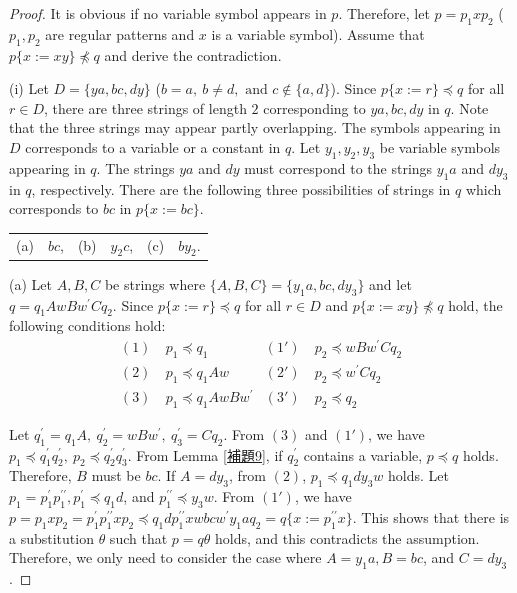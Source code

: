 \begin{proof}
It is obvious if no variable symbol appears in $p$.
Therefore, let $p=p_{1}xp_{2}$ ($p_{1}, p_{2}$ are regular patterns and $x$ is a variable symbol). Assume that $p \{ x := xy \} \not \preceq q$ and derive the contradiction.

\noindent\textrm{(i)}
Let $D=\{ ya, bc, dy \}$ ($b = a,~b \not= d,\mbox{~and~}c \not\in \{a,d\}$).
Since $p \{ x := r \} \preceq q$ for all $r \in D$, there are three strings of length $2$ corresponding to $ya, bc, dy$ in $q$. Note that the three strings may appear partly overlapping.
The symbols appearing in $D$ corresponds to a variable or a constant in $q$.
Let $y_{1}, y_{2}, y_{3}$ be variable symbols appearing in $q$.
The strings $ya$ and $dy$ must correspond to the strings $y_{1}a$ and $dy_{3}$ in $q$, respectively.
There are the following three possibilities of strings in $q$ which corresponds to $bc$ in $p\{x:=bc\}$.
\begin{center}
\begin{tabular}{cccccc}
\textrm{(a)} & $bc$, &
\textrm{(b)} & $y_{2}c$, &
\textrm{(c)} & $by_{2}$.
\end{tabular}
\end{center}

\textrm{(a)}
Let $A,B,C$ be strings where $\{ A,B,C \} = \{ y_{1}a,bc,dy_{3} \}$ and let $q=q_{1}AwBw^{\prime}Cq_{2}$.
Since $p \{ x := r \} \preceq q$ for all $r \in D$ and $p \{ x := xy \} \not \preceq q$ hold, the following conditions hold:
\begin{align*}
(1)~& p_{1} \preceq q_{1} & (1')~& p_{2} \preceq wBw^{\prime}Cq_{2} \\
(2)~& p_{1} \preceq q_{1}Aw & (2')~& p_{2} \preceq w^{\prime}Cq_{2} \\
(3)~& p_{1} \preceq q_{1}AwBw^{\prime} & (3')~& p_{2} \preceq q_{2}
\end{align*}

Let $q^{\prime}_{1}=q_{1}A,~q^{\prime}_{2}=wBw^{\prime},~q^{\prime}_{3}=Cq_{2}$. From $(3)$ and $(1')$, we have $p_{1} \preceq q^{\prime}_{1}q^{\prime}_{2},~p_{2} \preceq q^{\prime}_{2}q^{\prime}_{3}$.
From Lemma \ref{補題9}, if $q^{\prime}_{2}$ contains a variable, $p \preceq q$ holds.
Therefore, $B$ must be $bc$.
If $A=dy_{3}$, from $(2)$, $p_{1} \preceq q_{1}dy_{3}w$ holds.
Let $p_{1}=p^{\prime}_{1}p^{\prime\prime}_{1}, p^{\prime}_{1} \preceq q_{1}d$, and $p^{\prime\prime}_{1} \preceq y_{3}w$.
From $(1')$, we have $p=p_{1}xp_{2}=p^{\prime}_{1}p^{\prime\prime}_{1}xp_{2} \preceq q_{1}dp^{\prime\prime}_{1}xwbcw^{\prime}y_{1}aq_{2}=q \{ x:=p^{\prime\prime}_{1}x \}$. This shows that there is a substitution $\theta$ such that $p=q\theta$ holds, and this contradicts the assumption. Therefore, we only need to consider the case where $A=y_{1}a,B=bc$, and $C=dy_{3}$.


\end{proof}
